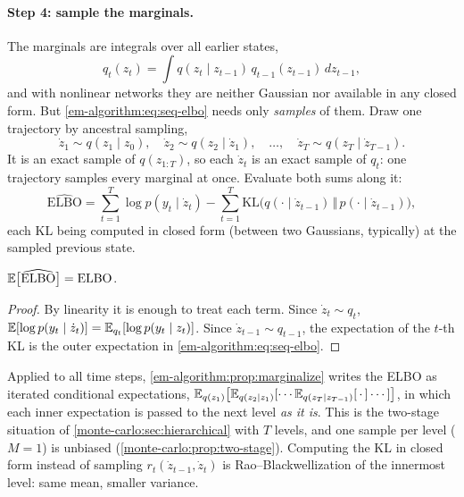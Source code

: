 \begin{notechapter}
\paragraph{Step 4: sample the marginals.} The marginals are integrals over all
earlier states,
\[
  q_t(z_t) = \int q(z_t\mid z_{t-1})\,q_{t-1}(z_{t-1})\,dz_{t-1},
\]
and with nonlinear networks they are neither Gaussian nor available in any closed
form. But \cref{em-algorithm:eq:seq-elbo} needs only \emph{samples} of them. Draw one
trajectory by ancestral sampling,
\[
  \dot z_1\sim q(z_1\mid z_0),\quad \dot z_2\sim q(z_2\mid\dot z_1),\quad\dots,\quad
  \dot z_T\sim q(z_T\mid\dot z_{T-1}).
\]
It is an exact sample of $q(z_{1:T})$, so each $\dot z_t$ is an exact sample of $q_t$:
one trajectory samples every marginal at once. Evaluate both sums along it:
\begin{equation}\label{em-algorithm:eq:elbo-estimator}
  \widehat{\mathrm{ELBO}} = \sum_{t=1}^T\log p(y_t\mid\dot z_t)
  - \sum_{t=1}^T\mathrm{KL}\bigl(q(\cdot\mid\dot z_{t-1})\,\Vert\,p(\cdot\mid\dot z_{t-1})\bigr),
\end{equation}
each KL being computed in closed form (between two Gaussians, typically) at the
sampled previous state.

\begin{proposition}\label{em-algorithm:prop:unbiased}
$\mathbb{E}\bigl[\widehat{\mathrm{ELBO}}\bigr] = \mathrm{ELBO}$.
\end{proposition}

\begin{proof}
By linearity it is enough to treat each term. Since $\dot z_t\sim q_t$,
$\mathbb{E}[\log p(y_t\mid\dot z_t)] = \mathbb{E}_{q_t}[\log p(y_t\mid z_t)]$. Since
$\dot z_{t-1}\sim q_{t-1}$, the expectation of the $t$-th KL is the outer expectation in
\cref{em-algorithm:eq:seq-elbo}.
\end{proof}

\begin{intuition}
Applied to all time steps, \cref{em-algorithm:prop:marginalize} writes the ELBO as
iterated conditional expectations, $\mathbb{E}_{q(z_1)}\bigl[\mathbb{E}_{q(z_2\mid z_1)}[\cdots\mathbb{E}_{q(z_T\mid z_{T-1})}[\,\cdot\,]\cdots]\bigr]$,
in which each inner expectation is passed to the next level \emph{as it is}. This is
the two-stage situation of \cref{monte-carlo:sec:hierarchical} with $T$ levels, and
one sample per level ($M = 1$) is unbiased (\cref{monte-carlo:prop:two-stage}).
Computing the KL in closed form instead of sampling $r_t(\dot z_{t-1},\dot z_t)$ is
Rao--Blackwellization of the innermost level: same mean, smaller variance.
\end{intuition}


\end{notechapter}

